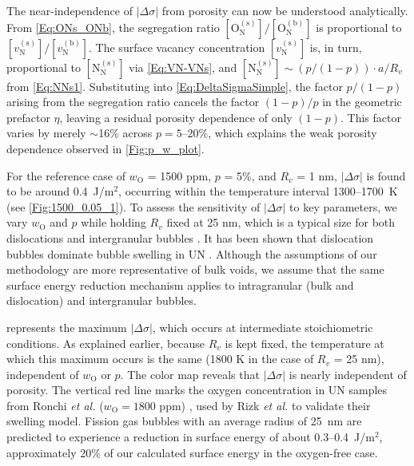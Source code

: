 \documentclass[preprint,12pt,sort&compress]{elsarticle}
\newcommand{\?}{\stackrel{?}{=}}
\begin{document}
The near-independence of $|\Delta \sigma|$ from porosity can now be understood analytically. From \cref{Eq:ONs_ONb}, the segregation ratio $[\text{O}_\text{N}^{(\text{s})}] / [\text{O}_\text{N}^{(\text{b})}]$ is proportional to $[v_\text{N}^{(\text{s})}] / [v_\text{N}^{(\text{b})}]$. The surface vacancy concentration $[v_\text{N}^{(\text{s})}]$ is, in turn, proportional to $[\text{N}_\text{N}^{(\text{s})}]$ via \cref{Eq:VN-VNs}, and $[\text{N}_\text{N}^{(\text{s})}] \sim (p/(1-p)) \cdot a/R_v$ from \cref{Eq:NNs1}. Substituting into \cref{Eq:DeltaSigmaSimple}, the factor $p/(1-p)$ arising from the segregation ratio cancels the factor $(1-p)/p$ in the geometric prefactor $\eta$, leaving a residual porosity dependence of only $(1-p)$. This factor varies by merely $\sim$16\% across $p = 5$--20\%, which explains the weak porosity dependence observed in \cref{Fig:p_w_plot}.

For the reference case of $w_\text{O}$ = 1500 ppm, $p$ = 5\%, and $R_v$ = 1 nm, $|\Delta \sigma|$ is found to be around 0.4~J/m$^2$, occurring within the temperature interval 1300--1700~K (see \cref{Fig:1500_0.05_1}). To assess the sensitivity of $|\Delta \sigma|$ to key parameters, we vary $w_\text{O}$ and $p$ while holding $R_v$ fixed at 25 nm, which is a typical size for both dislocations and intergranular bubbles \cite{Colin1983}. It has been shown that dislocation bubbles dominate bubble swelling in UN \cite{Ronchi1975,Ronchi1978,Rizk2025}. Although the assumptions of our methodology are more representative of bulk voids, we assume that the same surface energy reduction mechanism applies to intragranular (bulk and dislocation) and intergranular bubbles.

 represents the maximum $|\Delta \sigma|$, which occurs at intermediate stoichiometric conditions. As explained earlier, because $R_v$ is kept fixed, the temperature at which this maximum occurs is the same (1800 K in the case of $R_v$ = 25 nm), independent of $w_\text{O}$ or $p$. The color map reveals that $|\Delta \sigma|$ is nearly independent of porosity. The vertical red line marks the oxygen concentration in UN samples from Ronchi \textit{et al.} ($w_\text{O} = 1800$ ppm) \cite{Ronchi1975,Ronchi1978}, used by Rizk \textit{et al.} \cite{Rizk2025} to validate their swelling model. Fission gas bubbles with an average radius of 25~nm are predicted to experience a reduction in surface energy of about 0.3--0.4~J/m$^2$, approximately 20\% of our calculated surface energy in the oxygen-free case.
\end{document}
